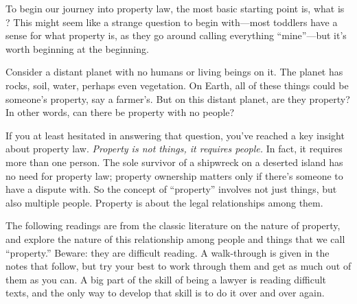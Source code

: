 
To begin our journey into property law, the most basic starting point is, what
is ? This might seem like a strange question to begin with---most
toddlers have a sense for what property is, as they go around calling everything
``mine''---but it's worth beginning at the beginning.

Consider a distant planet with no humans or living beings on it. The planet has
rocks, soil, water, perhaps even vegetation. On Earth, all of these things could
be someone's property, say a farmer's. But on this distant planet, are they
property? In other words, can there be property with no people?

If you at least hesitated in answering that question, you've reached a key
insight about property law. \emph{Property is not things, it requires people.}
In fact, it requires more than one person. The sole survivor of a shipwreck on a
deserted island has no need for property law; property ownership matters only if
there's someone to have a dispute with. So the concept of ``property'' involves
not just things, but also multiple people. Property is about the legal
relationships among them.

The following readings are from the classic literature on the nature of
property, and explore the nature of this relationship among people and things
that we call ``property.'' Beware: they are difficult reading. A walk-through is
given in the notes that follow, but try your best to work through them and get
as much out of them as you can. A big part of the skill of being a lawyer is
reading difficult texts, and the only way to develop that skill is to do it over
and over again.

